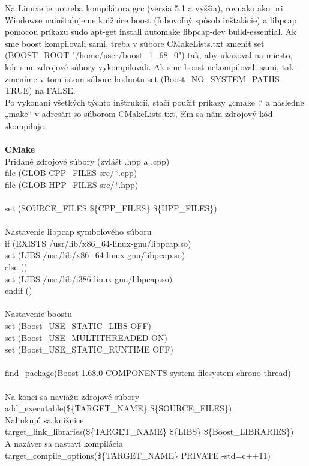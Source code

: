 \documentclass[a4paper,12pt]{article}
\begin{document}
Na Linuxe je potreba kompilátora gcc (verzia 5.1 a vyššia), rovnako ako pri Windowse nainštalujeme knižnice boost (ľubovoľný spôsob inštalácie) a libpcap pomocou príkazu sudo apt-get install automake libpcap-dev build-essential.
Ak sme boost kompilovali sami, treba v súbore CMakeLists.txt zmeniť set (BOOST\_ROOT "/home/user/boost\_1\_68\_0") tak, aby ukazoval na miesto, kde sme zdrojové súbory vykompilovali. Ak sme boost nekompilovali sami, tak zmeníme v tom istom súbore hodnotu set (Boost\_NO\_SYSTEM\_PATHS TRUE) na FALSE.
\\
Po vykonaní všetkých týchto inštrukcií, stačí použiť príkazy „cmake .“ a následne „make“ v adresári so súborom CMakeLists.txt, čím sa nám zdrojový kód skompiluje.
\\
\\
\textbf{CMake} \\
Pridané zdrojové súbory (zvlášť .hpp a .cpp) \\
file (GLOB CPP\_FILES src/*.cpp) \\
file (GLOB HPP\_FILES src/*.hpp) \\
\\
set (SOURCE\_FILES \$\{CPP\_FILES\} \$\{HPP\_FILES\}) \\
\\
Nastavenie libpcap symbolového súboru \\
if (EXISTS /usr/lib/x86\_64-linux-gnu/libpcap.so) \\
set (LIBS /usr/lib/x86\_64-linux-gnu/libpcap.so) \\
else () \\
set (LIBS /usr/lib/i386-linux-gnu/libpcap.so) \\
endif () \\
\\
Nastavenie boostu  \\
set (Boost\_USE\_STATIC\_LIBS OFF) \\
set (Boost\_USE\_MULTITHREADED ON) \\
set (Boost\_USE\_STATIC\_RUNTIME OFF) \\ \\
find\_package(Boost 1.68.0 COMPONENTS system filesystem chrono thread) \\ \\
Na konci sa naviažu zdrojové súbory \\
add\_executable(\$\{TARGET\_NAME\} \$\{SOURCE\_FILES\}) \\
Nalinkujú sa knižnice  \\
target\_link\_libraries(\$\{TARGET\_NAME\} \$\{LIBS\} \$\{Boost\_LIBRARIES\}) \\
A nazáver sa nastaví kompilácia \\
target\_compile\_options(\$\{TARGET\_NAME\} PRIVATE -std=c++11) \\
\end{document}
